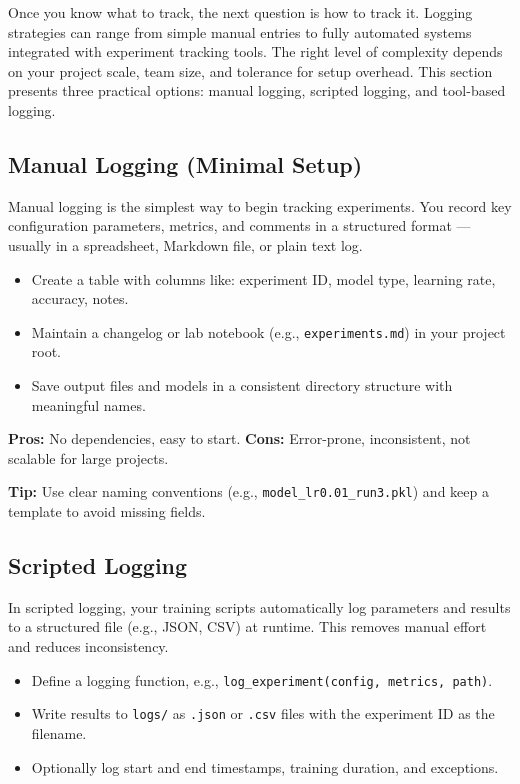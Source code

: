 \documentclass[12pt,openany]{book}
\begin{document}
Once you know what to track, the next question is how to track it. Logging strategies can range from simple manual entries to fully automated systems integrated with experiment tracking tools. The right level of complexity depends on your project scale, team size, and tolerance for setup overhead. This section presents three practical options: manual logging, scripted logging, and tool-based logging.

\subsection{Manual Logging (Minimal Setup)}

Manual logging is the simplest way to begin tracking experiments. You record key configuration parameters, metrics, and comments in a structured format — usually in a spreadsheet, Markdown file, or plain text log.

\begin{itemize}
    \item Create a table with columns like: experiment ID, model type, learning rate, accuracy, notes.
    \item Maintain a changelog or lab notebook (e.g., \texttt{experiments.md}) in your project root.
    \item Save output files and models in a consistent directory structure with meaningful names.
\end{itemize}

\textbf{Pros:} No dependencies, easy to start.  
\textbf{Cons:} Error-prone, inconsistent, not scalable for large projects.

\textbf{Tip:} Use clear naming conventions (e.g., \texttt{model\_lr0.01\_run3.pkl}) and keep a template to avoid missing fields.

\subsection{Scripted Logging}

In scripted logging, your training scripts automatically log parameters and results to a structured file (e.g., JSON, CSV) at runtime. This removes manual effort and reduces inconsistency.

\begin{itemize}
    \item Define a logging function, e.g., \texttt{log\_experiment(config, metrics, path)}.
    \item Write results to \texttt{logs/} as \texttt{.json} or \texttt{.csv} files with the experiment ID as the filename.
    \item Optionally log start and end timestamps, training duration, and exceptions.
\end{itemize}
\end{document}
